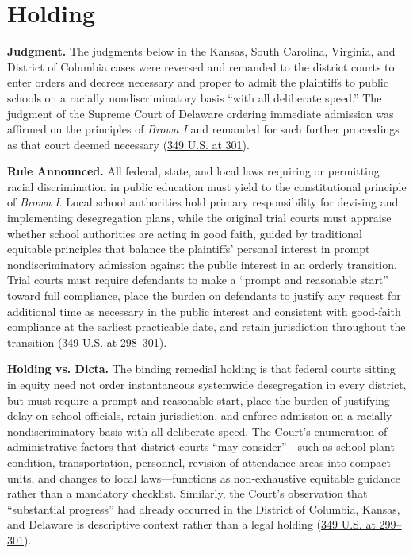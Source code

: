 \documentclass[12pt]{article}
\begin{document}
\section{Holding}

\textbf{Judgment.} The judgments below in the Kansas, South Carolina, Virginia, and District of Columbia cases were reversed and remanded to the district courts to enter orders and decrees necessary and proper to admit the plaintiffs to public schools on a racially nondiscriminatory basis ``with all deliberate speed.'' The judgment of the Supreme Court of Delaware ordering immediate admission was affirmed on the principles of \textit{Brown I} and remanded for such further proceedings as that court deemed necessary (\href{https://supreme.justia.com/cases/federal/us/349/294/}{349 U.S. at 301}).

\textbf{Rule Announced.} All federal, state, and local laws requiring or permitting racial discrimination in public education must yield to the constitutional principle of \textit{Brown I}. Local school authorities hold primary responsibility for devising and implementing desegregation plans, while the original trial courts must appraise whether school authorities are acting in good faith, guided by traditional equitable principles that balance the plaintiffs' personal interest in prompt nondiscriminatory admission against the public interest in an orderly transition. Trial courts must require defendants to make a ``prompt and reasonable start'' toward full compliance, place the burden on defendants to justify any request for additional time as necessary in the public interest and consistent with good-faith compliance at the earliest practicable date, and retain jurisdiction throughout the transition (\href{https://supreme.justia.com/cases/federal/us/349/294/}{349 U.S. at 298--301}).

\textbf{Holding vs. Dicta.} The binding remedial holding is that federal courts sitting in equity need not order instantaneous systemwide desegregation in every district, but must require a prompt and reasonable start, place the burden of justifying delay on school officials, retain jurisdiction, and enforce admission on a racially nondiscriminatory basis with all deliberate speed. The Court's enumeration of administrative factors that district courts ``may consider''---such as school plant condition, transportation, personnel, revision of attendance areas into compact units, and changes to local laws---functions as non-exhaustive equitable guidance rather than a mandatory checklist. Similarly, the Court's observation that ``substantial progress'' had already occurred in the District of Columbia, Kansas, and Delaware is descriptive context rather than a legal holding (\href{https://supreme.justia.com/cases/federal/us/349/294/}{349 U.S. at 299--301}).
\end{document}
